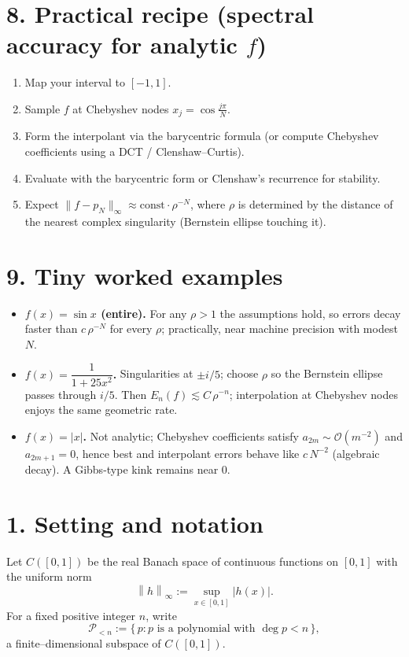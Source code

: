 \documentclass[11pt,a4paper]{article}
\theoremstyle{definition}
\theoremstyle{definition}
\theoremstyle{plain}
\theoremstyle{remark}
\newcommand{\norm}[1]{\left\lVert #1 \right\rVert}
\newcommand{\Pspace}{\mathcal{P}_{<n}}
\begin{document}
\section*{8. Practical recipe (spectral accuracy for analytic $f$)}
\begin{enumerate}[leftmargin=*]
	\item Map your interval to $[-1,1]$.
	\item Sample $f$ at Chebyshev nodes $x_j=\cos\frac{j\pi}{N}$.
	\item Form the interpolant via the barycentric formula (or compute Chebyshev coefficients using a DCT / Clenshaw--Curtis).
	\item Evaluate with the barycentric form or Clenshaw's recurrence for stability.
	\item Expect $\|f-p_N\|_\infty\approx \mathrm{const}\cdot \rho^{-N}$, where $\rho$ is determined by the distance of the nearest complex singularity (Bernstein ellipse touching it).
\end{enumerate}

\section*{9. Tiny worked examples}
\begin{itemize}[leftmargin=*]
	\item \textbf{$f(x)=\sin x$ (entire).} For any $\rho>1$ the assumptions hold, so errors decay faster than $c\,\rho^{-N}$ for every $\rho$; practically, near machine precision with modest $N$.
	\item \textbf{$f(x)=\dfrac{1}{1+25x^2}$.} Singularities at $\pm i/5$; choose $\rho$ so the Bernstein ellipse passes through $i/5$. Then $E_n(f)\lesssim C\,\rho^{-n}$; interpolation at Chebyshev nodes enjoys the same geometric rate.
	\item \textbf{$f(x)=|x|$.} Not analytic; Chebyshev coefficients satisfy $a_{2m}\sim \mathcal O(m^{-2})$ and $a_{2m+1}=0$, hence best and interpolant errors behave like $c\,N^{-2}$ (algebraic decay). A Gibbs-type kink remains near $0$.
\end{itemize}



\section*{1. Setting and notation}
Let \(C([0,1])\) be the real Banach space of continuous functions on \([0,1]\) with the uniform norm
\[
\norm{h}_\infty := \sup_{x\in[0,1]} \lvert h(x)\rvert .
\]
For a fixed positive integer \(n\), write
\[
\Pspace := \{\, p : \text{$p$ is a polynomial with }\deg p < n \,\},
\]
a finite–dimensional subspace of \(C([0,1])\).
\end{document}
